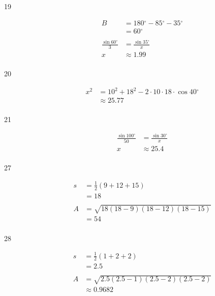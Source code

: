 \documentclass{exam}
\newcommand{\dg}{\ensuremath{^\circ}}
\begin{document}
\begin{description}
      \item[19]
        \begin{align*}
          B & = 180 \dg - 85 \dg - 35 \dg \\
            & = 60 \dg \\
            \\
          \frac{\sin 60 \dg}{3} & = \frac{\sin 35 \dg}{x} \\
          x                     & \approx \boxed{ 1.99 } \\
        \end{align*}

      \item[20]
        \begin{align*}
          x^2 & = 10^2 + 18^2 - 2 \cdot 10 \cdot 18 \cdot \cos 40 \dg \\
              & \approx \boxed{ 25.77 } \\
        \end{align*}

      \item[21]
        \begin{align*}
          \frac{\sin 100 \dg}{50} & = \frac{\sin 30 \dg}{x} \\
          x                       & \approx \boxed{ 25.4 } \\
        \end{align*}

      \item[27]
        \begin{align*}
          s  & = \frac{1}{2}(9 + 12 + 15) \\
             & = 18 \\
          \\
          A  & = \sqrt{18 (18 - 9)(18 - 12) (18 - 15)} \\
             & = \boxed{ 54 } \\
        \end{align*}

      \item[28]
        \begin{align*}
          s  & = \frac{1}{2}(1 + 2 + 2) \\
             & = 2.5 \\
          \\
          A  & = \sqrt{2.5 (2.5 - 1)(2.5 - 2) (2.5 - 2)} \\
             & \approx \boxed{ 0.9682 } \\
        \end{align*}


\end{description}
\end{document}
